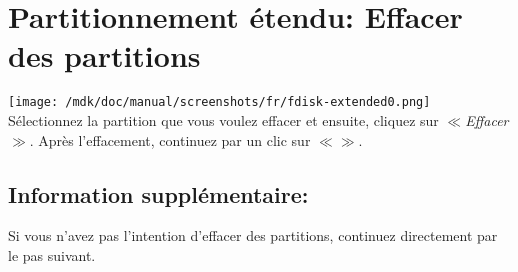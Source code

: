 \section{Partitionnement \'etendu: Effacer des partitions}
\texttt{[image: /mdk/doc/manual/screenshots/fr/fdisk-extended0.png]} \\
S\'electionnez la partition que vous voulez effacer et ensuite, cliquez sur \textit{$\ll$Effacer$\gg$}. Apr\`es l'effacement, continuez par un clic sur \textit{$\ll$$\gg$}.\\
\subsection{Information suppl\'ementaire:}
Si vous n'avez pas l'intention d'effacer des partitions, continuez directement par le pas suivant.\\

